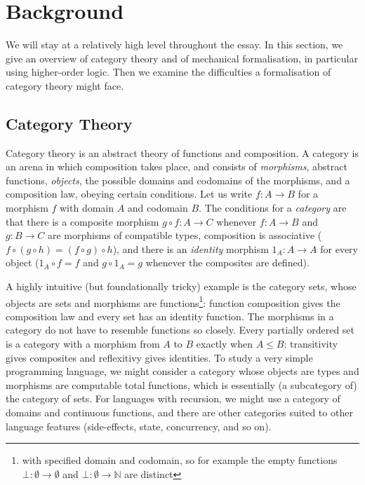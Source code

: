 \documentclass[twoside,titlepage,11pt]{article}
\begin{document}
\section{Background}%
We will stay at a relatively high level throughout the essay.
In this section, we give an overview of category theory and of mechanical formalisation, in particular using higher-order logic.
Then we examine the difficulties a formalisation of category theory might face.
\subsection{Category Theory}%
Category theory is an abstract theory of functions and composition.
A category is an arena in which composition takes place, and consists of \emph{morphisms}, abstract functions, \emph{objects}, the possible domains and codomains of the morphisms, and a composition law, obeying certain conditions.
Let us write $f:A\to B$ for a morphism $f$ with domain $A$ and codomain $B$.
The conditions for a \emph{category} are that there is a composite morphism $g\circ f:A\to C$ whenever $f:A\to B$ and $g:B\to C$ are morphisms of compatible types, composition is associative ($f\circ(g\circ h)=(f\circ g)\circ h$), and there is an \emph{identity} morphism ${1_A}:A\to A$ for every object (${1_A}\circ f=f$ and $g\circ{1_A}=g$ whenever the composites are defined).%

A highly intuitive (but foundationally tricky) example is the category sets, whose objects are sets and morphisms are functions\footnote{with specified domain and codomain, so for example the empty functions $\bot:\emptyset\to\emptyset$ and $\bot:\emptyset\to\mathbb{N}$ are distinct}: function composition gives the composition law and every set has an identity function.
The morphisms in a category do not have to resemble functions so closely.
Every partially ordered set is a category with a morphism from $A$ to $B$ exactly when $A\leq B$: transitivity gives composites and reflexitivy gives identities.
To study a very simple programming language, we might consider a category whose objects are types and morphisms are computable total functions, which is essentially (a subcategory of) the category of sets.
For languages with recursion, we might use a category of domains and continuous functions, and there are other categories suited to other language features (side-effects, state, concurrency, and so on).%
\end{document}
